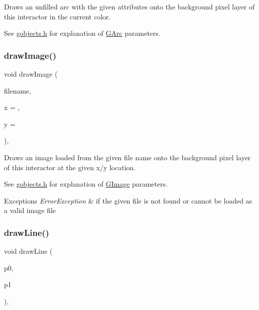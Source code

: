 Draws an unfilled arc with the given attributes onto the background pixel layer of this interactor in the current color. 

See \mbox{\hyperlink{gobjects_8h_source}{gobjects.\+h}} for explanation of \mbox{\hyperlink{classsgl_1_1GArc}{G\+Arc}} parameters. \mbox{\label{classsgl_1_1GDrawingSurface_abdd4cb1f2c64adc5d03522a1ee30febf}} 
\subsubsection{\texorpdfstring{draw\+Image()}{drawImage()}}
{\footnotesize\ttfamily void draw\+Image (\begin{DoxyParamCaption}\item[{const std\+::string \&}]{filename,  }\item[{double}]{x = {},  }\item[{double}]{y = {} }\end{DoxyParamCaption})\hspace{0.3cm}{\ttfamily [virtual]}, {\ttfamily [inherited]}}



Draws an image loaded from the given file name onto the background pixel layer of this interactor at the given x/y location. 

See \mbox{\hyperlink{gobjects_8h_source}{gobjects.\+h}} for explanation of \mbox{\hyperlink{classsgl_1_1GImage}{G\+Image}} parameters. 
\begin{DoxyExceptions}{Exceptions}
{\em Error\+Exception} & if the given file is not found or cannot be loaded as a valid image file \\
\hline
\end{DoxyExceptions}
\mbox{\label{classsgl_1_1GDrawingSurface_ae6a24b6b9a6e795d3165c1c750d5bdf1}} 
\subsubsection{\texorpdfstring{draw\+Line()}{drawLine()}\hspace{0.1cm}{\footnotesize\ttfamily [1/2]}}
{\footnotesize\ttfamily void draw\+Line (\begin{DoxyParamCaption}\item[{const \mbox{\hyperlink{structsgl_1_1GPoint}{G\+Point}} \&}]{p0,  }\item[{const \mbox{\hyperlink{structsgl_1_1GPoint}{G\+Point}} \&}]{p1 }\end{DoxyParamCaption})\hspace{0.3cm}{\ttfamily [virtual]}, {\ttfamily [inherited]}}



